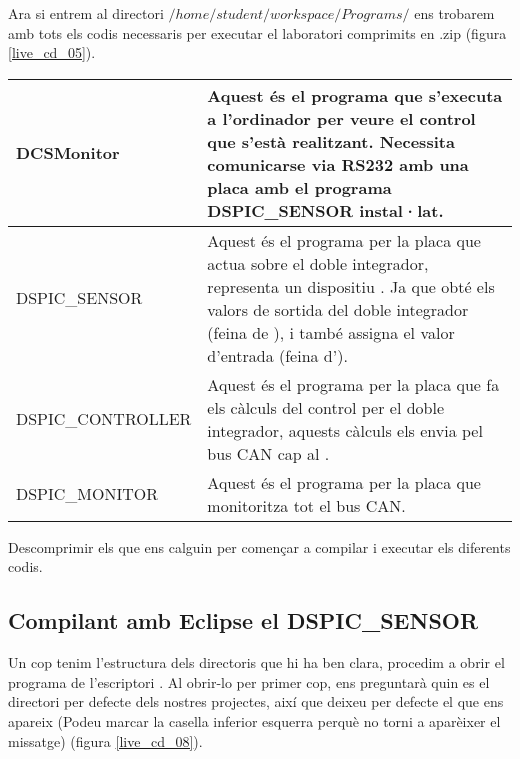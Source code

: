 
Ara si entrem al directori $/home/student/workspace/Programs/$ ens trobarem amb tots els codis necessaris per executar el laboratori comprimits en .zip (figura \ref{live_cd_05}).

\begin{center}
	\begin{tabularx}{\linewidth}{l | X}
		DCSMonitor & Aquest és el programa que s'executa a l'ordinador per veure el control que s'està realitzant. Necessita comunicarse via RS232 amb una placa \FLEX amb el programa DSPIC\_SENSOR instal·lat.\\
		\hline
		DSPIC\_SENSOR & Aquest és el programa per la placa \FLEX que actua sobre el doble integrador, representa un dispositiu \SensorActuador. Ja que obté els valors de sortida del doble integrador (feina de \Sensor), i també assigna el valor d'entrada (feina d'\Actuador).\\
		\hline
		DSPIC\_CONTROLLER & Aquest és el programa per la placa \FLEX que fa els càlculs del control per el doble integrador, aquests càlculs els envia pel bus CAN cap al \SensorActuador. \\
		\hline
		DSPIC\_MONITOR & Aquest és el programa per la placa \FLEX que monitoritza tot el bus CAN.  \\
	\end{tabularx}
	\label{tab:gui:cd:workspace}
\end{center}

Descomprimir els que ens calguin per començar a compilar i executar els diferents codis.

\subsection{Compilant amb Eclipse el DSPIC\_SENSOR}\label{cap:gui:cd:comp:ecl:sensor}

Un cop tenim l'estructura dels directoris que hi ha ben clara, procedim a obrir el programa de l'escriptori \Eclipse.
Al obrir-lo per primer cop, ens preguntarà quin es el directori per defecte dels nostres projectes, així que deixeu per defecte el que ens apareix (Podeu marcar la casella inferior esquerra perquè no torni a aparèixer el missatge) (figura \ref{live_cd_08}).

